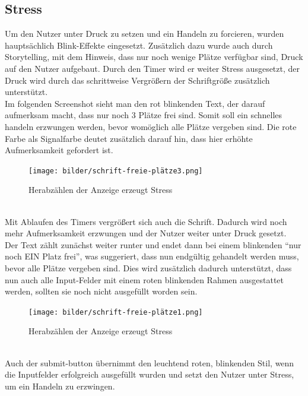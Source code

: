 \documentclass[./dokumentation.tex]{subfiles}
\begin{document}
\subsection{Stress}
Um den Nutzer unter Druck zu setzen und ein Handeln zu forcieren, wurden hauptsächlich Blink-Effekte eingesetzt. Zusätzlich dazu wurde auch durch Storytelling, mit dem Hinweis, dass nur noch wenige Plätze verfügbar sind, Druck auf den Nutzer aufgebaut. Durch den Timer wird er weiter Stress ausgesetzt, der Druck wird durch das schrittweise Vergrößern der Schriftgröße zusätzlich unterstützt.\\
Im folgenden Screenshot sieht man den rot blinkenden Text, der darauf aufmerksam macht, dass nur noch 3 Plätze frei sind. Somit soll ein schnelles handeln erzwungen werden, bevor womöglich alle Plätze vergeben sind. Die rote Farbe als Signalfarbe deutet zusätzlich darauf hin, dass hier erhöhte Aufmerksamkeit gefordert ist.\\


\begin{figure}[h]
    \centering
    \texttt{[image: bilder/schrift-freie-plätze3.png]}
    \caption{Herabzählen der Anzeige erzeugt Stress}
    \label{fig14:platz}
\end{figure}\\


Mit Ablaufen des Timers vergrößert sich auch die Schrift. Dadurch wird noch mehr Aufmerksamkeit erzwungen und der Nutzer weiter unter Druck gesetzt.\\
Der Text zählt zunächst weiter runter und endet dann bei einem blinkenden “nur noch EIN Platz frei”, was suggeriert, dass nun endgültig gehandelt werden muss, bevor alle Plätze vergeben sind. Dies wird zusätzlich dadurch unterstützt, dass nun auch alle Input-Felder mit einem roten blinkenden Rahmen ausgestattet werden, sollten sie noch nicht ausgefüllt worden sein. \\


\begin{figure}[h]
    \centering
    \texttt{[image: bilder/schrift-freie-plätze1.png]}
    \caption{Herabzählen der Anzeige erzeugt Stress}
    \label{fig14:platz1}
\end{figure}\\

Auch der submit-button übernimmt den leuchtend roten, blinkenden Stil, wenn die Inputfelder erfolgreich ausgefüllt wurden und setzt den Nutzer unter Stress, um ein Handeln zu erzwingen.

\end{document}
